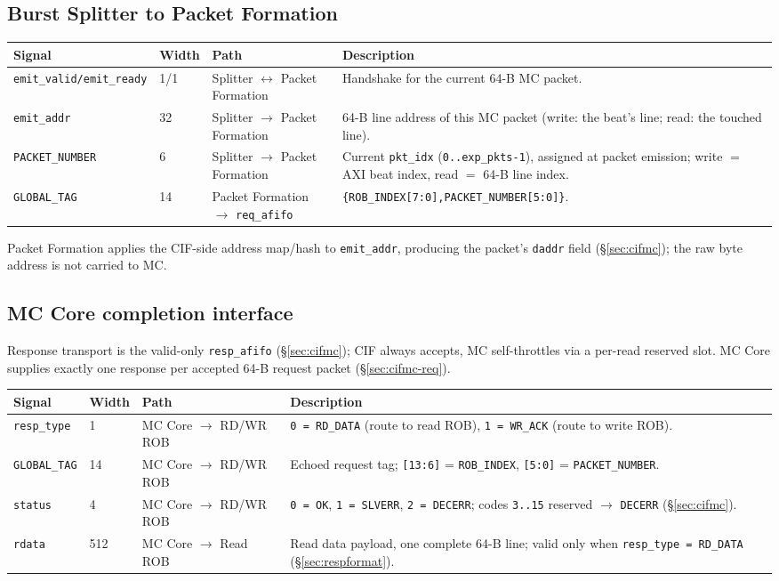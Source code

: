 \subsection{Burst Splitter to Packet Formation}
\begin{longtable}{p{3.3cm}p{1cm}p{3.4cm}p{7cm}}
\toprule
\textbf{Signal} & \textbf{Width} & \textbf{Path} & \textbf{Description}\\
\midrule
\texttt{emit\_valid/emit\_ready} & 1/1 & Splitter $\leftrightarrow$ Packet Formation & Handshake for the current 64-B MC packet.\\
\texttt{emit\_addr} & 32 & Splitter $\rightarrow$ Packet Formation & 64-B line address of this MC packet (write: the beat's line; read: the touched line).\\
\texttt{PACKET\_NUMBER} & 6 & Splitter $\rightarrow$ Packet Formation & Current \texttt{pkt\_idx} (\texttt{0..exp\_pkts-1}), assigned at packet emission; write $=$ AXI beat index, read $=$ 64-B line index.\\
\texttt{GLOBAL\_TAG} & 14 & Packet Formation $\rightarrow$ \texttt{req\_afifo} & \texttt{\{ROB\_INDEX[7:0],PACKET\_NUMBER[5:0]\}}.\\
\bottomrule
\end{longtable}

\noindent Packet Formation applies the CIF-side address map/hash to
\texttt{emit\_addr}, producing the packet's \texttt{daddr} field
(\S\ref{sec:cifmc}); the raw byte address is not carried to MC.

\subsection{MC Core completion interface}

Response transport is the valid-only \texttt{resp\_afifo} (\S\ref{sec:cifmc});
CIF always accepts, MC self-throttles via a per-read reserved slot.  MC Core
supplies exactly one response per accepted 64-B request packet
(\S\ref{sec:cifmc-req}).

\begin{longtable}{p{3.3cm}p{1cm}p{3.4cm}p{7cm}}
\toprule
\textbf{Signal} & \textbf{Width} & \textbf{Path} & \textbf{Description}\\
\midrule
\texttt{resp\_type} & 1 & MC Core $\rightarrow$ RD/WR ROB & \texttt{0 = RD\_DATA} (route to read ROB), \texttt{1 = WR\_ACK} (route to write ROB).\\
\texttt{GLOBAL\_TAG} & 14 & MC Core $\rightarrow$ RD/WR ROB & Echoed request tag; \texttt{[13:6]} = \texttt{ROB\_INDEX}, \texttt{[5:0]} = \texttt{PACKET\_NUMBER}.\\
\texttt{status} & 4 & MC Core $\rightarrow$ RD/WR ROB & \texttt{0 = OK}, \texttt{1 = SLVERR}, \texttt{2 = DECERR}; codes \texttt{3..15} reserved $\to$ \texttt{DECERR} (\S\ref{sec:cifmc}).\\
\texttt{rdata} & 512 & MC Core $\rightarrow$ Read ROB & Read data payload, one complete 64-B line; valid only when \texttt{resp\_type = RD\_DATA} (\S\ref{sec:respformat}).\\
\bottomrule
\end{longtable}

